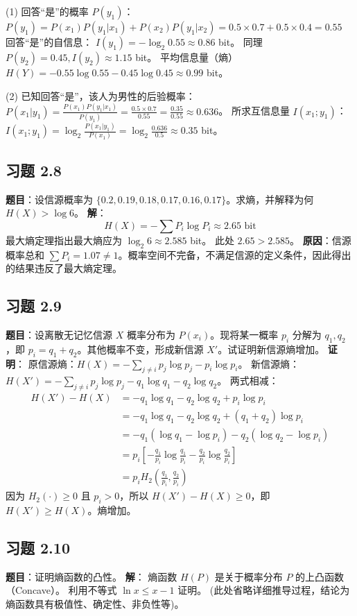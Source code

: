 \documentclass[11pt, a4paper]{article}
\begin{document}
(1) 回答“是”的概率 $P(y_1)$：
$P(y_1) = P(x_1)P(y_1|x_1) + P(x_2)P(y_1|x_2) = 0.5\times0.7 + 0.5\times0.4 = 0.55$
回答“是”的自信息：
$I(y_1) = -\log_2 0.55 \approx 0.86$ bit。
同理 $P(y_2) = 0.45, I(y_2) \approx 1.15$ bit。
平均信息量（熵）$H(Y) = -0.55\log0.55 - 0.45\log0.45 \approx 0.99$ bit。

(2) 已知回答“是”，该人为男性的后验概率：
$P(x_1|y_1) = \frac{P(x_1)P(y_1|x_1)}{P(y_1)} = \frac{0.5 \times 0.7}{0.55} = \frac{0.35}{0.55} \approx 0.636$。
所求互信息量 $I(x_1; y_1)$：
$I(x_1; y_1) = \log_2 \frac{P(x_1|y_1)}{P(x_1)} = \log_2 \frac{0.636}{0.5} \approx 0.35$ bit。

\subsection*{习题 2.8}
\textbf{题目}：设信源概率为 $\{0.2, 0.19, 0.18, 0.17, 0.16, 0.17\}$。求熵，并解释为何 $H(X) > \log 6$。
\textbf{解}：
\[ H(X) = - \sum P_i \log P_i \approx 2.65 \text{ bit} \]
最大熵定理指出最大熵应为 $\log_2 6 \approx 2.585$ bit。
此处 $2.65 > 2.585$。
\textbf{原因}：信源概率总和 $\sum P_i = 1.07 \neq 1$。概率空间不完备，不满足信源的定义条件，因此得出的结果违反了最大熵定理。

\subsection*{习题 2.9}
\textbf{题目}：设离散无记忆信源 $X$ 概率分布为 $P(x_i)$。现将某一概率 $p_i$ 分解为 $q_1, q_2$，即 $p_i = q_1 + q_2$。其他概率不变，形成新信源 $X'$。试证明新信源熵增加。
\textbf{证明}：
原信源熵：$H(X) = - \sum_{j \neq i} p_j \log p_j - p_i \log p_i$。
新信源熵：$H(X') = - \sum_{j \neq i} p_j \log p_j - q_1 \log q_1 - q_2 \log q_2$。
两式相减：
\[
\begin{aligned}
H(X') - H(X) &= -q_1 \log q_1 - q_2 \log q_2 + p_i \log p_i \\
&= -q_1 \log q_1 - q_2 \log q_2 + (q_1+q_2) \log p_i \\
&= -q_1 (\log q_1 - \log p_i) - q_2 (\log q_2 - \log p_i) \\
&= p_i [ -\frac{q_1}{p_i} \log \frac{q_1}{p_i} - \frac{q_2}{p_i} \log \frac{q_2}{p_i} ] \\
&= p_i H_2(\frac{q_1}{p_i}, \frac{q_2}{p_i})
\end{aligned}
\]
因为 $H_2(\cdot) \ge 0$ 且 $p_i > 0$，所以 $H(X') - H(X) \ge 0$，即 $H(X') \ge H(X)$。熵增加。

\subsection*{习题 2.10}
\textbf{题目}：证明熵函数的凸性。
\textbf{解}：
熵函数 $H(P)$ 是关于概率分布 $P$ 的上凸函数（Concave）。
利用不等式 $\ln x \le x - 1$ 证明。
(此处省略详细推导过程，结论为熵函数具有极值性、确定性、非负性等)。
\end{document}
